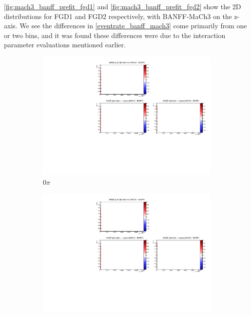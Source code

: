 \autoref{fig:mach3_banff_prefit_fgd1} and \autoref{fig:mach3_banff_prefit_fgd2} show the 2D \pmu \cosmu distributions for FGD1 and FGD2 respectively, with BANFF-MaCh3 on the z-axis. We see the differences in \autoref{eventrate_banff_mach3} come primarily from one or two bins, and it was found these differences were due to the interaction parameter evaluations mentioned earlier.
\begin{figure}[h]
	\begin{subfigure}[t]{0.32\textwidth}
		\includegraphics[width=\textwidth, trim={5mm 70mm 100mm 7mm}, clip, page=1]{figures/mach3/banff/momentumProjections_170328_withMACH3_MAQEonly}
		\caption{0$\pi$}
	\end{subfigure}
	\begin{subfigure}[t]{0.32\textwidth}
		\includegraphics[width=\textwidth, trim={5mm 70mm 100mm 7mm}, clip, page=2]{figures/mach3/banff/momentumProjections_170328_withMACH3_MAQEonly}

\end{subfigure}
\end{figure}
